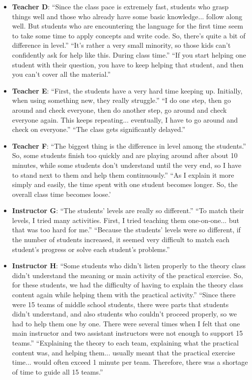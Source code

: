 \documentclass{article} %
\begin{document}
\begin{summarybox}
\begin{itemize}[itemsep=0em, topsep=0.5em, labelsep=0.5em, leftmargin=0.5em]
    \item \textbf{Teacher D}: ``Since the class pace is extremely fast, students who grasp things well and those who already have some basic knowledge... follow along well. But students who are encountering the language for the first time seem to take some time to apply concepts and write code. So, there's quite a bit of difference in level.''  ``It's rather a very small minority, so those kids can't confidently ask for help like this. During class time.''  ``If you start helping one student with their question, you have to keep helping that student, and then you can't cover all the material.'' 
    \item \textbf{Teacher E}: ``First, the students have a very hard time keeping up. Initially, when using something new, they really struggle.''  ``I do one step, then go around and check everyone, then do another step, go around and check everyone again. This keeps repeating... eventually, I have to go around and check on everyone.''  ``The class gets significantly delayed.''
    \item \textbf{Teacher F}: ``The biggest thing is the difference in level among the students.''  So, some students finish too quickly and are playing around after about 10 minutes, while some students don't understand until the very end, so I have to stand next to them and help them continuously.''  ``As I explain it more simply and easily, the time spent with one student becomes longer. So, the overall class time becomes loose.'
    \item \textbf{Instructor G}: ``The students' levels are really so different.''  ``To match their levels, I tried many activities. First, I tried teaching them one-on-one... but that was too hard for me.''  ``Because the students' levels were so different, if the number of students increased, it seemed very difficult to match each student's progress or solve each student's problems.''
    \item \textbf{Instructor H}: ``Some students who didn't listen properly to the theory class didn't understand the meaning or main activity of the practical exercise. So, for these students, we had the difficulty of having to explain the theory class content again while helping them with the practical activity.''  ``Since there were 15 teams of middle school students, there were parts that students didn't understand, and also students who couldn't proceed properly, so we had to help them one by one. There were several times when I felt that one main instructor and two assistant instructors were not enough to support 15 teams.''  ``Explaining the theory to each team, explaining what the practical content was, and helping them... usually meant that the practical exercise time... would often exceed 1 minute per team. Therefore, there was a shortage of time to guide all 15 teams.'' 
\end{itemize}
\end{summarybox}
\end{document}
